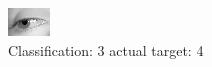 \begin{figure}[h!]
\begin{center}
\includegraphics[width=0.60\columnwidth]{figures/ID3022_class_3_target_4.png}
\end{center}
\caption{ Classification: 3 actual target: 4}
\label{fig:ID3022_class_3_target_4}
\end{figure}
